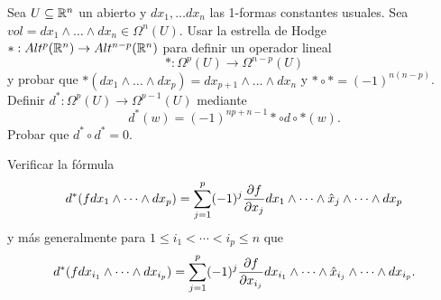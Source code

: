 \documentclass[twoside]{article}
\begin{document}
\begin{ejercicio}{3.2}
Sea $U\subseteq\mathbb{R}^n$ un abierto y $dx_1,\dots dx_n$ las 1-formas constantes usuales. Sea $vol=dx_1\land\dots\land dx_n\in\Omega^n(U)$. Usar la estrella de Hodge $*:Alt^p(\mathbb{R}^n)\to Alt^{n-p}(\mathbb{R}^n)$ para definir un operador lineal  $$*:\Omega^p(U)\to\Omega^{n-p}(U)$$
y probar que $*(dx_1\land\dots\land dx_p)=dx_{p+1}\land\dots\land dx_n$ y $*\circ *=(-1)^{n(n-p)}$. Definir $d^*:\Omega^p(U)\to\Omega^{p-1}(U)$ mediante
$$d^*(w)=(-1)^{np+n-1}*\circ d\circ *(w).$$
Probar que $d^*\circ d^*=0$. 

Verificar la fórmula 
\[
d^*(fdx_1\land\dots\land dx_p)=\sum_{j=1}^p(-1)^j\frac{\partial f}{\partial x_j}dx_1\land\dots\land\hat{x}_j\land\dots\land dx_p
\]
y más generalmente para $1\leq i_1<\cdots <i_p\leq n$ que 
\[
d^*(fdx_{i_1}\land\dots\land dx_{i_p})=\sum_{j=1}^p(-1)^j\frac{\partial f}{\partial x_{i_j}}dx_{i_1}\land\dots\land\hat{x}_{i_j}\land\dots\land dx_{i_p}.
\]
\end{ejercicio}
\end{document}
